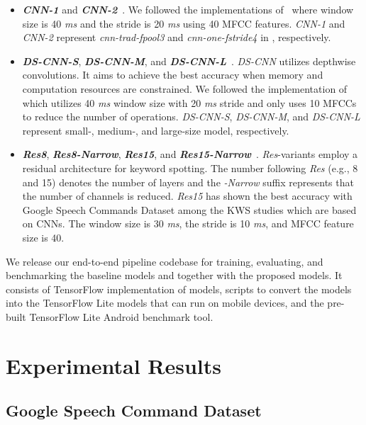 \documentclass[a4paper]{article}
\begin{document}
\begin{itemize}
\item \textbf{\emph{CNN-1}} and \textbf{\emph{CNN-2}}~\cite{sainath-interspeech-2015-cnn}.
We followed the implementations of~\cite{zhang-arxiv-2017-helloedge} where window size is 40 \emph{ms} and the stride is 20 \emph{ms} using 40 MFCC features.
\emph{CNN-1} and \emph{CNN-2} represent \emph{cnn-trad-fpool3} and \emph{cnn-one-fstride4} in \cite{sainath-interspeech-2015-cnn}, respectively.
\item \textbf{\emph{DS-CNN-S}}, \textbf{\emph{DS-CNN-M}}, and \textbf{\emph{DS-CNN-L}}~\cite{zhang-arxiv-2017-helloedge}. 
\emph{DS-CNN} utilizes depthwise convolutions. 
It aims to achieve the best accuracy when memory and computation resources are constrained.
We followed the implementation of~\cite{zhang-arxiv-2017-helloedge} which utilizes 40 \emph{ms} window size with 20 \emph{ms} stride and only uses 10 MFCCs to reduce the number of operations.
\emph{DS-CNN-S}, \emph{DS-CNN-M}, and \emph{DS-CNN-L} represent small-, medium-, and large-size model, respectively.
\item \textbf{\emph{Res8}}, \textbf{\emph{Res8-Narrow}}, \textbf{\emph{Res15}}, and \textbf{\emph{Res15-Narrow}}~\cite{tang-icassp-2018-residual}.
\emph{Res}-variants employ a residual architecture for keyword spotting.
The number following \emph{Res} (e.g., 8 and 15) denotes the number of layers and the \emph{-Narrow} suffix represents that the number of channels is reduced.
\emph{Res15} has shown the best accuracy with Google Speech Commands Dataset among the KWS studies which are based on CNNs.
The window size is 30 \emph{ms}, the stride is 10 \emph{ms}, and MFCC feature size is 40.
\end{itemize}
We release our end-to-end pipeline codebase for training, evaluating, and benchmarking the baseline models and together with the proposed models.
It consists of TensorFlow implementation of models, scripts to convert the models into the TensorFlow Lite models that can run on mobile devices, and the pre-built TensorFlow Lite Android benchmark tool.





\section{Experimental Results}\label{section:results}


\subsection{Google Speech Command Dataset}
\end{document}
